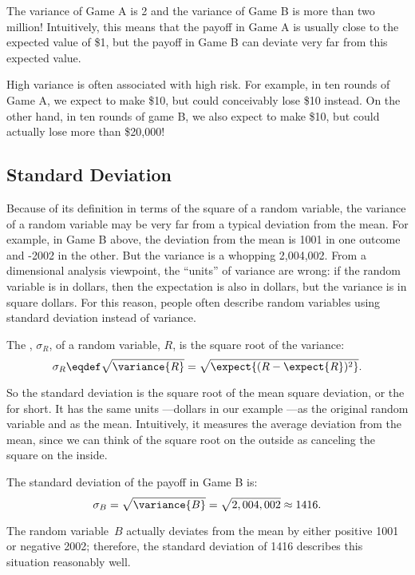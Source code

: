 The variance of Game A is 2 and the variance of Game B is more than
two million!  Intuitively, this means that the payoff in Game A is
usually close to the expected value of \$1, but the payoff in Game B
can deviate very far from this expected value.

High variance is often associated with high risk.  For example, in ten
rounds of Game A, we expect to make \$10, but could conceivably lose
\$10  instead.  On the other hand, in ten rounds of game B, we also
expect to make \$10, but could actually lose more than \$20,000!

\subsection{Standard Deviation}

Because of its definition in terms of the square of a random variable, the
variance of a random variable may be very far from a typical deviation
from the mean.  For example, in Game B above, the deviation from the mean
is 1001 in one outcome and -2002 in the other. But the variance is a
whopping 2,004,002.  From a dimensional analysis viewpoint, the ``units''
of variance are wrong: if the random variable is in dollars, then the
expectation is also in dollars, but the variance is in square dollars.
For this reason, people often describe random variables using standard
deviation instead of variance.

\begin{definition}
The , $\sigma_R$, of a random variable, $R$, is
the square root of the variance:
\[
\sigma_R \eqdef \sqrt{\variance{R}} = \sqrt{\expect{(R - \expect{R})^2}}.
\]      
\end{definition}

So the standard deviation is the square root of the mean square
deviation, or the  for short.  It has the same
units ---dollars in our example ---as the original random variable and
as the mean.  Intuitively, it measures the average deviation from the
mean, since we can think of the square root on the outside as
canceling the square on the inside.

\begin{example}
The standard deviation of the payoff in Game B is:
\[
    \sigma_B  = \sqrt{\variance{B}} = \sqrt{2,004,002} \approx 1416.
\]

The random variable~$B$ actually deviates from the mean by either
positive 1001  or negative 2002; therefore, the standard
deviation of 1416 describes this situation reasonably well.
\end{example}

